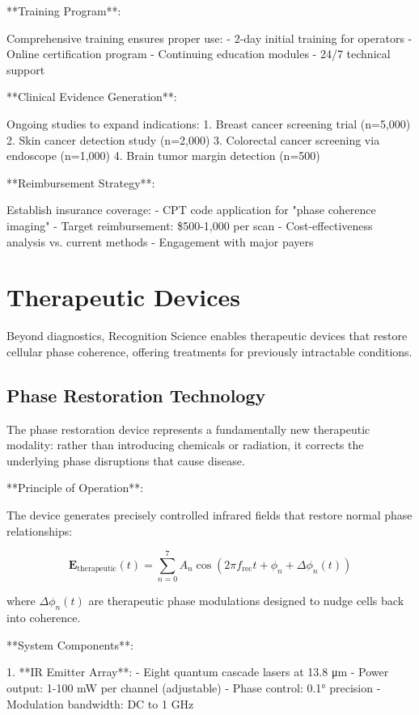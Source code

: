 \documentclass[12pt,a4paper]{report}
\begin{document}
**Training Program**:

Comprehensive training ensures proper use:
- 2-day initial training for operators
- Online certification program
- Continuing education modules
- 24/7 technical support

**Clinical Evidence Generation**:

Ongoing studies to expand indications:
1. Breast cancer screening trial (n=5,000)
2. Skin cancer detection study (n=2,000)
3. Colorectal cancer screening via endoscope (n=1,000)
4. Brain tumor margin detection (n=500)

**Reimbursement Strategy**:

Establish insurance coverage:
- CPT code application for "phase coherence imaging"
- Target reimbursement: \$500-1,000 per scan
- Cost-effectiveness analysis vs. current methods
- Engagement with major payers

\section{Therapeutic Devices}

Beyond diagnostics, Recognition Science enables therapeutic devices that restore cellular phase coherence, offering treatments for previously intractable conditions.

\subsection{Phase Restoration Technology}

The phase restoration device represents a fundamentally new therapeutic modality: rather than introducing chemicals or radiation, it corrects the underlying phase disruptions that cause disease.

**Principle of Operation**:

The device generates precisely controlled infrared fields that restore normal phase relationships:

\begin{equation}
\mathbf{E}_{\text{therapeutic}}(t) = \sum_{n=0}^{7} A_n \cos(2\pi f_{\text{rec}} t + \phi_n + \Delta\phi_n(t))
\end{equation}

where $\Delta\phi_n(t)$ are therapeutic phase modulations designed to nudge cells back into coherence.

**System Components**:

1. **IR Emitter Array**:
   - Eight quantum cascade lasers at 13.8 μm
   - Power output: 1-100 mW per channel (adjustable)
   - Phase control: 0.1° precision
   - Modulation bandwidth: DC to 1 GHz
\end{document}
